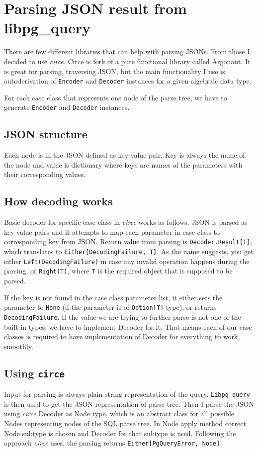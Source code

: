 \section{Parsing JSON result from libpg\_query}
There are few different libraries that can help with parsing JSONs. From those I decided to use \textit{circe}. Circe is fork of a pure functional library called Argonaut. It is great for parsing, traversing JSON, but the main functionality I use is autoderivation of \texttt{Encoder} and \texttt{Decoder} instances for a given algebraic data type. 

For each case class that represents one node of the parse tree, we have to generate \texttt{Encoder} and \texttt{Decoder} instances.

\subsection{JSON structure}
Each node is in the JSON defined as key-value pair. Key is always the name of the node and value is dictionary where keys are names of the parameters with their corresponding values. 

\subsection{How decoding works}
Basic decoder for specific case class in \textit{circe} works as follows. JSON is parsed as key-value pairs and it attempts to map each parameter in case class to corresponding key from JSON. Return value from parsing is \texttt{Decoder.Result[T]}, which translates to \texttt{Either[DecodingFailure, T]}. As the name suggests, you get either \texttt{Left(DecodingFailure)} in case any invalid operation happens during the parsing, or \texttt{Right(T)}, where \texttt{T} is the required object that is supposed to be parsed. 

If the key is not found in the case class parameter list, it either sets the parameter to \texttt{None} (if the parameter is of \texttt{Option[T]} type), or returns \texttt{DecodingFailure}. If the value we are trying to further parse is not one of the built-in types, we have to implement Decoder for it. That means each of our case classes is required to have implementation of Decoder for everything to work smoothly.

\subsection{Using \texttt{circe}}
Input for parsing is always plain string representation of the query. \texttt{Libpg\_query} is then used to get the JSON representation of parse tree. Then I parse the JSON using \textit{circe} Decoder as Node type, which is an abstract class for all possible Nodes representing nodes of the SQL parse tree. In Node apply method correct Node subtype is chosen and Decoder for that subtype is used. Following the approach \textit{circe} uses, the parsing returns \texttt{Either[PgQueryError, Node]}.

